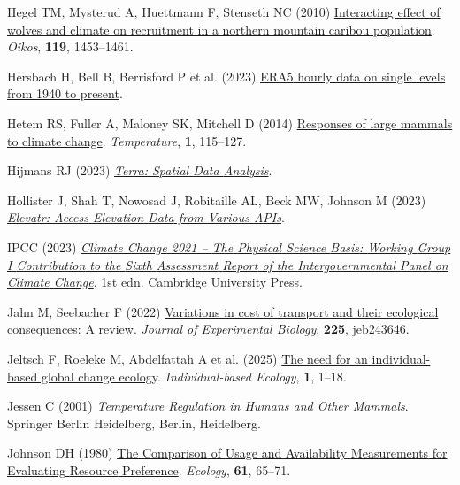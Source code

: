 \documentclass[
  12pt,
]{article}
\newlength{\cslhangindent}
\newenvironment{CSLReferences}[2] %
 {\begin{list}{}{%
  \setlength{\itemindent}{0pt}
  \setlength{\leftmargin}{0pt}
  \setlength{\parsep}{0pt}
  \ifodd #1
   \setlength{\leftmargin}{\cslhangindent}
   \setlength{\itemindent}{-1\cslhangindent}
  \fi
  \setlength{\itemsep}{#2\baselineskip}}}
 {\end{list}}
\begin{document}
\begin{CSLReferences}{1}{0}
Hegel TM, Mysterud A, Huettmann F, Stenseth NC (2010) \href{https://doi.org/10.1111/j.1600-0706.2010.18358.x}{Interacting effect of wolves and climate on recruitment in a northern mountain caribou population}. \emph{Oikos}, \textbf{119}, 1453--1461.

Hersbach H, Bell B, Berrisford P et al. (2023) \href{https://doi.org/10.24381/CDS.ADBB2D47}{{ERA5} hourly data on single levels from 1940 to present}.

Hetem RS, Fuller A, Maloney SK, Mitchell D (2014) \href{https://doi.org/10.4161/temp.29651}{Responses of large mammals to climate change}. \emph{Temperature}, \textbf{1}, 115--127.

Hijmans RJ (2023) \emph{\emph{\href{https://CRAN.R-project.org/package=terra}{Terra: {Spatial} {Data} {Analysis}}}}.

Hollister J, Shah T, Nowosad J, Robitaille AL, Beck MW, Johnson M (2023) \emph{\emph{\href{https://doi.org/10.5281/zenodo.8335450}{Elevatr: {Access} {Elevation} {Data} from {Various} {APIs}}}}.

IPCC (2023) \emph{\emph{\href{https://doi.org/10.1017/9781009157896}{Climate {Change} 2021 -- {The} {Physical} {Science} {Basis}: {Working} {Group} {I} {Contribution} to the {Sixth} {Assessment} {Report} of the {Intergovernmental} {Panel} on {Climate} {Change}}}}, 1st edn. Cambridge University Press.

Jahn M, Seebacher F (2022) \href{https://doi.org/10.1242/jeb.243646}{Variations in cost of transport and their ecological consequences: A review}. \emph{Journal of Experimental Biology}, \textbf{225}, jeb243646.

Jeltsch F, Roeleke M, Abdelfattah A et al. (2025) \href{https://doi.org/10.3897/ibe.1.148200}{The need for an individual-based global change ecology}. \emph{Individual-based Ecology}, \textbf{1}, 1--18.

Jessen C (2001) \emph{\emph{Temperature {Regulation} in {Humans} and {Other} {Mammals}}}. Springer Berlin Heidelberg, Berlin, Heidelberg.

Johnson DH (1980) \href{https://doi.org/10.2307/1937156}{The {Comparison} of {Usage} and {Availability} {Measurements} for {Evaluating} {Resource} {Preference}}. \emph{Ecology}, \textbf{61}, 65--71.


\end{CSLReferences}
\end{document}
